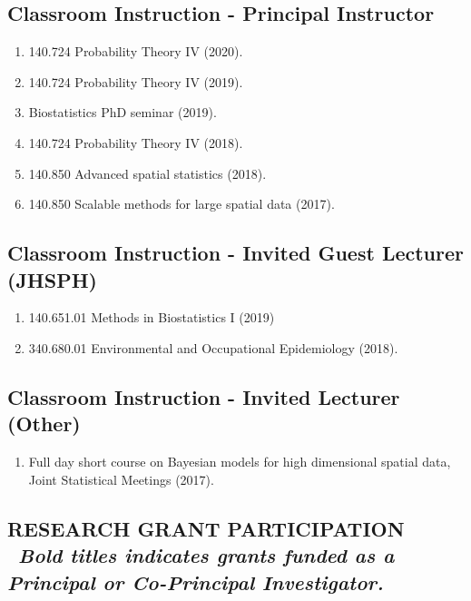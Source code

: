\documentclass[10pt]{article}
\newcommand{\mydot}[1]{\begin{enumerate}[label=$\circ$,leftmargin=\parindent]\setlength{\itemsep}{#1}}
\newcommand{\ee}{\end{enumerate}}
\newcommand{\mylift}[1]{\vspace*{#1}}
\begin{document}
\mylift{-0.5em}

\subsection*{Classroom Instruction - Principal Instructor}

\mydot{-0.1em}

\item 140.724 Probability Theory IV (2020).
\item 140.724 Probability Theory IV (2019).
\item Biostatistics PhD seminar (2019).
\item 140.724 Probability Theory IV (2018).
\item 140.850 Advanced spatial statistics (2018).
\item 140.850 Scalable methods for large spatial data (2017).

\ee

\mylift{-1.5em}

\subsection*{Classroom Instruction - Invited Guest Lecturer (JHSPH)}

\mydot{-0.1em}
\item 140.651.01 Methods in Biostatistics I (2019)
\item 340.680.01 Environmental and Occupational Epidemiology (2018).

\ee

\mylift{-1.5em}

\subsection*{Classroom Instruction - Invited Lecturer (Other)}

\mydot{-0.1em}

\item Full day short course on Bayesian models for high dimensional spatial data, Joint Statistical Meetings (2017). 

\ee

\subsection*{RESEARCH GRANT PARTICIPATION  \ {\small \em  Bold titles indicates grants funded as a Principal or Co-Principal Investigator.}}  %
\end{document}
